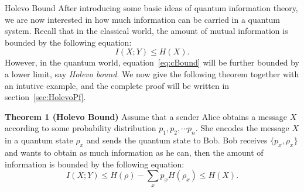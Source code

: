 \begin{subsection}{Holevo Bound}
After introducing some basic ideas of quantum information theory, we are now interested in how much information can be carried in a quantum system.
Recall that in the classical world, the amount of mutual information is bounded by the following equation:
\begin{equation}\label{eq:cBound}
I(X;Y) \leq H(X).
\end{equation}
However, in the quantum world, equation~\eqref{eq:cBound} will be further bounded by a lower limit, say {\it{Holevo bound}}.
We now give the following theorem together with an intutive example, and the complete proof will be written in section~\ref{sec:HolevoPf}.

\textbf{Theorem 1 (Holevo Bound)}
Assume that a sender Alice obtains a message $X$ according to some probability distribution $p_1,p_2,\cdots p_n$. She encodes the message $X$ in a quantum state $\rho_x$ and sends the quantum state to Bob. Bob receives $\{p_x,\rho_x\}$ and wants to obtain as much information as he can, then the amount of information is bounded by the following equation:
\begin{equation}\label{eq:HolevoBound}
I(X;Y) \leq H(\rho) - \underset{x}{\sum} p_xH(\rho_x) \leq H(X).
\end{equation}


\end{subsection}

